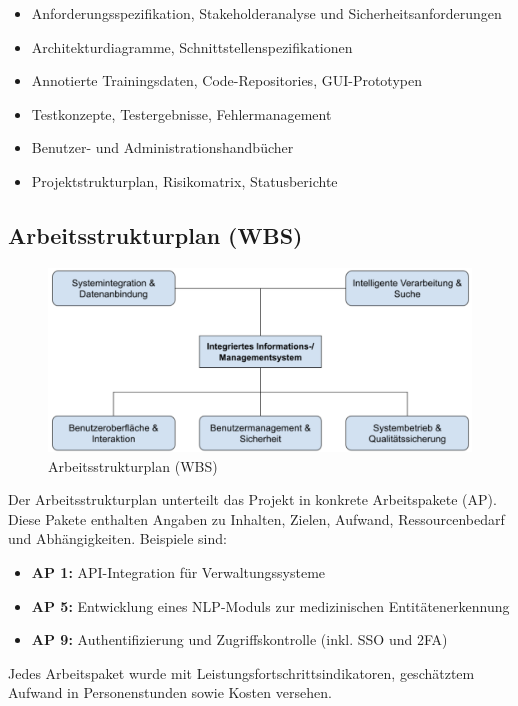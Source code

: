 \begin{itemize}
	\item Anforderungsspezifikation, Stakeholderanalyse und Sicherheitsanforderungen
	\item Architekturdiagramme, Schnittstellenspezifikationen
	\item Annotierte Trainingsdaten, Code-Repositories, GUI-Prototypen
	\item Testkonzepte, Testergebnisse, Fehlermanagement
	\item Benutzer- und Administrationshandbücher
	\item Projektstrukturplan, Risikomatrix, Statusberichte
\end{itemize}

\subsection{Arbeitsstrukturplan (WBS)}
\begin{figure}[ht]
	\centering
	\includegraphics[width=1\textwidth]{fig/wbs.png}
	\caption{Arbeitsstrukturplan (WBS)}
	\label{fig:arbeitsstrukturplan}
\end{figure}
Der Arbeitsstrukturplan unterteilt das Projekt in konkrete Arbeitspakete (AP). Diese Pakete enthalten Angaben zu Inhalten, Zielen, Aufwand, Ressourcenbedarf und Abhängigkeiten. Beispiele sind:

\begin{itemize}
	\item \textbf{AP 1:} API-Integration für Verwaltungssysteme
	\item \textbf{AP 5:} Entwicklung eines NLP-Moduls zur medizinischen Entitätenerkennung
	\item \textbf{AP 9:} Authentifizierung und Zugriffskontrolle (inkl. SSO und 2FA)
\end{itemize}

Jedes Arbeitspaket wurde mit Leistungsfortschrittsindikatoren, geschätztem Aufwand in Personenstunden sowie Kosten versehen.
\pagebreak
